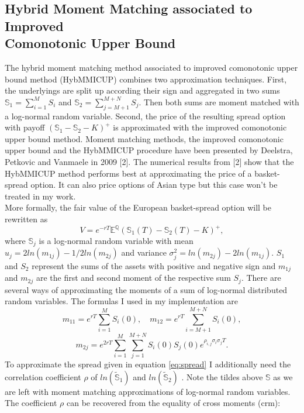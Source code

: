 \documentclass[a4paper]{article}
\begin{document}
\subsection{Hybrid Moment Matching associated to Improved \\Comonotonic Upper Bound}
\label{sec:hybmmicup}
The hybrid moment matching method associated to improved comonotonic upper bound method (HybMMICUP) combines two approximation techniques. First, the underlyings are split up according their sign and aggregated in two sums 
$\mathbb{S}_1=\sum_{i=1}^MS_i$ and $\mathbb{S}_2=\sum_{j=M+1}^{M+N}S_j.$ Then both sums are moment matched with a log-normal random variable. Second, the price of the resulting spread option with payoff $(\mathbb{S}_1-\mathbb{S}_2-K)^+$ is approximated with the improved comonotonic upper bound method. Moment matching methods, the improved comonotonic upper bound and the HybMMICUP procedure have been presented by Deelstra, Petkovic and Vanmaele in 2009 [2]. The numerical results from [2] show that the HybMMICUP method  performs best at approximating the price of a basket-spread option. It can also price options of Asian type but this case won’t be treated in my work.\\
More formally, the fair value of the European basket-spread option will be rewritten as
\begin{equation}
\label{eq:spread}
V = e^{-rT}\mathbb{E}^\mathbb{Q}(\mathbb{S}_1(T) - \mathbb{S}_2(T) - K)^+, 
\end{equation} 
where $\mathbb{S}_j$ is a log-normal random variable with mean $u_j = 2ln(m_{1j}) - 1/2ln(m_{2j})$ and variance $\sigma_j^2 = ln(m_{2j})-2ln(m_{1j}).$
$S_1$ and $S_2$ represent the sums of the assets with positive and negative sign and $m_{1j}$ and $m_{2j}$ are the first and second moment of the respective sum $S_j$. There are several ways of approximating the moments of a sum of log-normal distributed random variables. The formulas I used in my implementation 
are
\begin{equation}
m_{11}=e^{rT}\sum_{i=1}^{M}S_i(0), \quad m_{12}=e^{rT}\sum_{i=M+1}^{M+N}S_i(0), 
\end{equation}
\begin{equation}
m_{2j}=e^{2rT}\sum_{i=1}^{M}\sum_{j=1}^{M+N}S_i(0)S_j(0)e^{\rho_{i,j}\sigma_i\sigma_jT}.
\end{equation}
To approximate the spread given in equation \ref{eq:spread} I additionally need the correlation coefficient $\rho$ of $ln(\mathbb{\tilde{S}}_1)$ and $ln(\mathbb{\tilde{S}}_2)$ . Note the tildes above $\mathbb{S}$ as we are left with moment matching approximations of log-normal random variables. The coefficient $\rho$ can be recovered from the equality of cross moments (crm):
\end{document}

